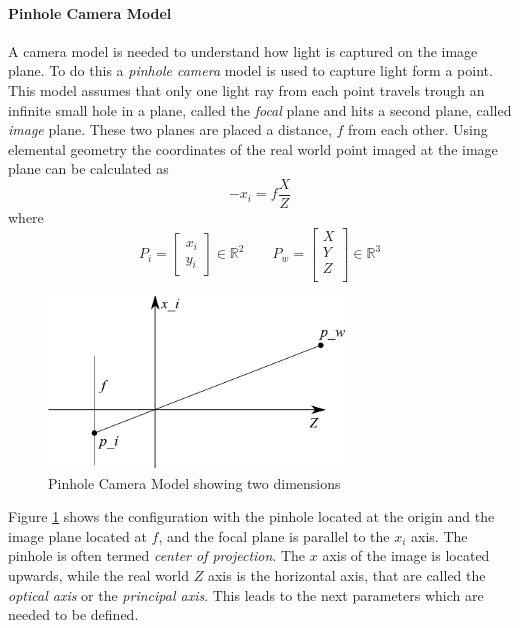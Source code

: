 \paragraph{Pinhole Camera Model}
A camera model is needed to understand how light is captured on the image plane. To do
this a \emph{pinhole camera} model is used to capture light form a point. This model
assumes that only one light ray from each point travels trough an infinite small hole in
a plane, called the \emph{focal} plane and hits a second plane, called \emph{image} plane.
These two planes are placed a distance, $f$ from each other. Using elemental geometry the
coordinates of the real world point imaged at the image plane can be calculated as
\begin{equation}
    -x_i = f \frac{X}{Z}
\end{equation}
where
\begin{equation}
    P_i = \left [ \begin{array}{c}
        x_i \\
        y_i 
    \end{array} \right]  \in \mathbb{R}^2 \quad \quad P_w = \left [
    \begin{array}{c}
        X \\
        Y \\
        Z \\ 
    \end{array} \right] \in \mathbb{R}^3 
\end{equation}
\begin{figure}[hbtp]
    \centering
    \includegraphics[width=0.7\textwidth]{pics/pinhole_model}
    \caption{Pinhole Camera Model showing two dimensions}
    \label{chap2:fig-pinholemodel}
\end{figure}

Figure \ref{chap2:fig-pinholemodel} shows the configuration with the pinhole located at
the origin and the image plane located at $f$, and the focal plane is parallel to the $x_i$
axis. The pinhole is often termed \emph{center of projection}. The $x$ axis of the image is located
upwards, while the real world $Z$ axis is the horizontal axis, that are called the
\emph{optical axis} or the \emph{principal axis}. This leads to the next parameters which
are needed to be defined.

